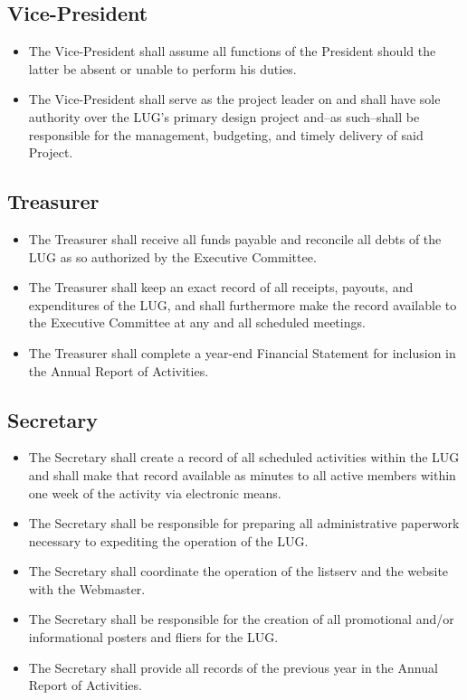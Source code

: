 \documentclass[letter]{report}
\begin{document}
\subsection{Vice-President}
\begin{itemize}
\item The Vice-President shall assume all functions of the President should the latter be absent or unable to perform his duties.
\item The Vice-President shall serve as the project leader on and shall have sole authority over the LUG's primary design project and--as such--shall be responsible for the management, budgeting, and timely delivery of said Project.
\end{itemize}
\subsection{Treasurer}
\begin{itemize}
\item The Treasurer shall receive all funds payable and reconcile all debts of the LUG as so authorized by the Executive Committee.
\item The Treasurer shall keep an exact record of all receipts, payouts, and expenditures of the LUG, and shall furthermore make the record available to the Executive Committee at any and all scheduled meetings.
\item The Treasurer shall complete a year-end Financial Statement for inclusion in the Annual Report of Activities.
\end{itemize}
\subsection{Secretary}
\begin{itemize}
\item The Secretary shall create a record of all scheduled activities within the LUG and shall make that record available as minutes to all active members within one week of the activity via electronic means.
\item The Secretary shall be responsible for preparing all administrative paperwork necessary to expediting the operation of the LUG.
\item The Secretary shall coordinate the operation of the listserv and the website with the Webmaster.
\item The Secretary shall be responsible for the creation of all promotional and/or informational posters and fliers for the LUG.
\item The Secretary shall provide all records of the previous year in the Annual Report of Activities.
\end{itemize}
\end{document}
